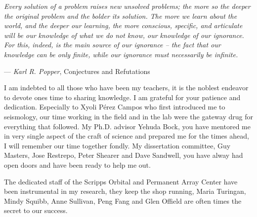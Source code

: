 \begin{frontmatter}
 \begin{myepigraph} %
 \vfil
\noindent
\emph{Every solution of a problem raises new unsolved problems; the more so the deeper the original problem and the bolder its solution. The more we learn about the world, and the deeper our learning, the more conscious, specific, and articulate will be our knowledge of what we do not know, our knowledge of our ignorance. For this, indeed, is the main source of our ignorance -- the fact that our knowledge can be only finite, while our ignorance must necessarily be infinite.}
 \vspace{10mm}
 
 
\begin{raggedright}
\hfill --- \emph{Karl R. Popper}, Conjectures and Refutations
\end{raggedright}
 \end{myepigraph}


%
\tableofcontents
\listoffigures  %
\listoftables   %



%
%
\begin{acknowledgements}
I am indebted to all those who have been my teachers, it is the noblest endeavor to devote ones time to sharing knowledge. I am grateful for your patience and dedication. Especially to Xyoli P\'erez Campos who first introduced me to seismology, our time working in the field and in the lab were the gateway drug for everything that followed. My Ph.D. advisor Yehuda Bock, you have mentored me in very single aspect of the craft of science and prepared me for the times ahead, I will remember our time together fondly. My dissertation committee, Guy Masters, Jose Restrepo, Peter Shearer and Dave Sandwell, you have alway had open doors and have been ready to help me out.

The dedicated staff of the Scripps Orbital and Permanent Array Center have been instrumental in my research, they keep the shop running, Maria Turingan, Mindy Squibb, Anne Sullivan, Peng Fang and Glen Offield are often times the secret to our success.


\end{acknowledgements}
\end{frontmatter}
